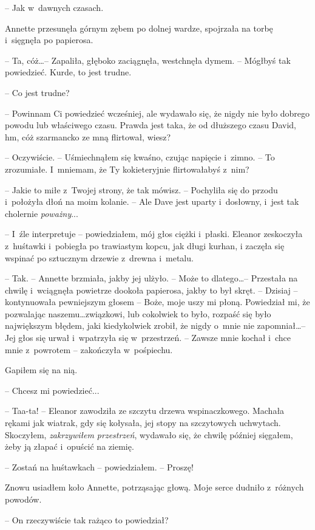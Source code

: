\documentclass[oneside,polish,11pt,sfheadings]{mwbk}
\begin{document}
-- Jak w~dawnych czasach.

Annette przesunęła górnym zębem po dolnej wardze, spojrzała na torbę i~sięgnęła po papierosa.

-- Ta, cóż\ldots -- Zapaliła, głęboko zaciągnęła, westchnęła dymem. -- Mógłbyś
tak powiedzieć. Kurde, to jest trudne.

-- Co jest trudne?

-- Powinnam Ci powiedzieć wcześniej, ale wydawało się, że nigdy nie było
dobrego powodu lub właściwego czasu. Prawda jest taka, że od dłuższego
czasu David, hm, cóż szarmancko ze mną flirtował, wiesz?

-- Oczywiście. -- Uśmiechnąłem się kwaśno, czując napięcie i~zimno. -- To
zrozumiałe. I~mniemam, że Ty kokieteryjnie flirtowałabyś z~nim?

-- Jakie to miłe z~Twojej strony, że tak mówisz. -- Pochyliła się do
przodu i~położyła dłoń na moim kolanie. -- Ale Dave jest uparty i~dosłowny, i~jest tak cholernie \emph{poważny}...

-- I~źle interpretuje -- powiedziałem, mój głos ciężki i~płaski. Eleanor
zeskoczyła z~huśtawki i~pobiegła po trawiastym kopcu, jak długi kurhan,
i zaczęła się wspinać po sztucznym drzewie z~drewna i~metalu.

-- Tak. -- Annette brzmiała, jakby jej ulżyło. -- Może to dlatego\ldots -- Przestała na chwilę i~wciągnęła powietrze dookoła papierosa, jakby to
był skręt. -- Dzisiaj -- kontynuowała pewniejszym głosem -- Boże, moje uszy
mi płoną. Powiedział mi, że pozwalając naszemu\ldots związkowi, lub
cokolwiek to było, rozpaść się było największym błędem, jaki
kiedykolwiek zrobił, że nigdy o~mnie nie zapomniał\ldots -- Jej głos się
urwał i~wpatrzyła się w~przestrzeń. -- Zawsze mnie kochał i~chce mnie z~powrotem -- zakończyła w~pośpiechu.

Gapiłem się na nią. 

-- Chcesz mi powiedzieć...

-- Taa-ta! -- Eleanor zawodziła ze szczytu drzewa wspinaczkowego. Machała
rękami jak wiatrak, gdy się kołysała, jej stopy na szczytowych
uchwytach. Skoczyłem, \emph{zakrzywiłem przestrzeń}, wydawało się, że
chwilę później sięgałem, żeby ją złapać i~opuścić na ziemię.

-- Zostań na huśtawkach -- powiedziałem. -- Proszę!

Znowu usiadłem koło Annette, potrząsając głową. Moje serce dudniło z~różnych powodów.

-- On rzeczywiście tak rażąco to powiedział?
\end{document}
